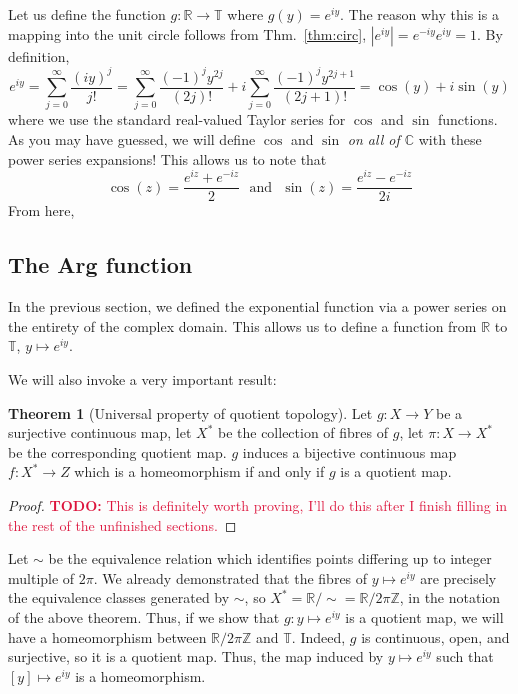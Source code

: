 \documentclass[aps,pra,showpacs,notitlepage,onecolumn,superscriptaddress,nofootinbib]{revtex4-1}
\newcommand{\pop}[1]{\textcolor{crimson}{#1}}
\theoremstyle{definition}
\newtheorem{theorem}{Theorem}[section]
\begin{document}
\noindent Let us define the function $g : \mathbb{R} \rightarrow \mathbb{T}$ where $g(y) = e^{iy}$. The reason why this is a mapping into the unit circle follows from Thm.~\ref{thm:circ}, $|e^{iy}| = e^{-iy} e^{iy} = 1$.
By definition,
\begin{equation}
  e^{iy} =  \displaystyle\sum_{j = 0}^{\infty} \frac{(iy)^j}{j!} = \displaystyle\sum_{j = 0}^{\infty} \frac{(-1)^{j} y^{2j}}{(2j)!} + i \displaystyle\sum_{j = 0}^{\infty} \frac{(-1)^{j} y^{2j + 1}}{(2j + 1)!} = \cos(y) + i \sin(y)
\end{equation}
where we use the standard real-valued Taylor series for $\cos$ and $\sin$ functions. As you may have guessed, we will define $\cos$ and $\sin$ \emph{on all of $\mathbb{C}$} with these power series expansions! This allows us to
note that
\begin{equation}
  \cos(z) = \frac{e^{iz} + e^{-iz}}{2} \ \ \ \text{and} \ \ \ \sin(z) = \frac{e^{iz} - e^{-iz}}{2i}
\end{equation}
From here,

\subsection{The Arg function}

\noindent In the previous section, we defined the exponential function via a power series on the entirety of the complex domain. This allows us to define a function from $\mathbb{R}$ to $\mathbb{T}$, $y \mapsto e^{iy}$.


\noindent We will also invoke a very important result:

\begin{theorem}[Universal property of quotient topology]
  Let $g : X \rightarrow Y$ be a surjective continuous map, let $X^{*}$ be the collection of fibres of $g$, let $\pi : X \rightarrow X^{*}$ be the corresponding quotient map. $g$ induces a bijective
  continuous map $f : X^{*} \rightarrow Z$ which is a homeomorphism if and only if $g$ is a quotient map.
\end{theorem}

\begin{proof}
 \pop{ \textbf{TODO:} This is definitely worth proving, I'll do this after I finish filling in the rest of the unfinished sections.}
  \end{proof}

\noindent Let $\sim$ be the equivalence relation which identifies points differing up to integer multiple of $2\pi$. We already demonstrated that the fibres of $y \mapsto e^{iy}$ are precisely the equivalence classes
generated by $\sim$, so $X^{*} = \mathbb{R}/\sim = \mathbb{R}/2\pi \mathbb{Z}$, in the notation of the above theorem. Thus, if we show that $g : y \mapsto e^{iy}$ is a quotient map, we will have a homeomorphism between $\mathbb{R}/2\pi \mathbb{Z}$
and $\mathbb{T}$. Indeed, $g$ is continuous, open, and surjective, so it is a quotient map. Thus, the map induced by $y \mapsto e^{iy}$ such that $[y] \mapsto e^{iy}$ is a homeomorphism.
\end{document}
